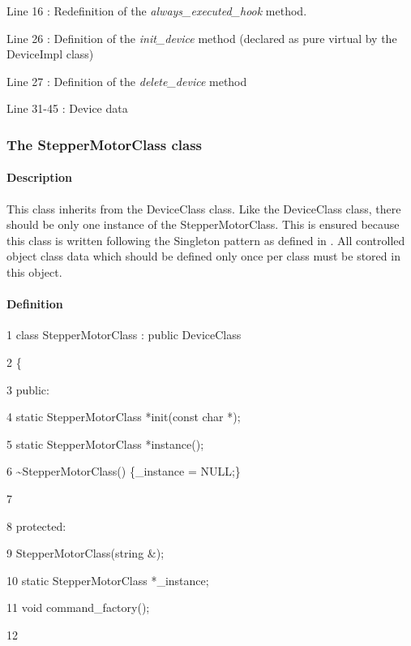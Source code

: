 Line 16 : Redefinition of the \emph{always\_executed\_hook}
method.

Line 26 : Definition of the \emph{init\_device}
method (declared as pure virtual by the DeviceImpl class)

Line 27 : Definition of the \emph{delete\_device}
method

Line 31-45 : Device data

\subsubsection{The StepperMotorClass class}

\paragraph{Description}

This class inherits from the DeviceClass class.
Like the DeviceClass class, there should be only one instance of the
StepperMotorClass. This is ensured because this class is written following
the Singleton pattern as defined in \cite{Patterns}.
All controlled object class data which should be defined only once
per class must be stored in this object.

\paragraph{Definition }



     1  class StepperMotorClass : public DeviceClass

     2  \{

3  public:

     4          static StepperMotorClass {*}init(const char {*});

     5          static StepperMotorClass {*}instance();

     6          \textasciitilde{}StepperMotorClass() \{\_instance
= NULL;\}

     7          

     8  protected:

     9          StepperMotorClass(string \&);

    10          static StepperMotorClass {*}\_instance;

    11          void command\_factory();

    12          

